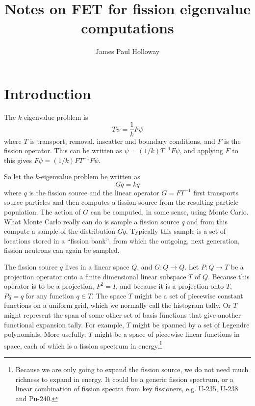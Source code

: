 \documentclass[11pt,onecolumn]{article}
\title{Notes on FET for fission eigenvalue computations}
\author{James Paul Holloway}
\begin{document}
\maketitle

\section{Introduction}

The $k$-eigenvalue problem is 
\begin{equation}
T \psi = \frac{1}{k} F \psi
\end{equation}
where $T$ is transport, removal, inscatter and boundary conditions, and $F$ is the fission operator.  This can be written as $\psi = (1/k) T^{-1} F \psi$, and applying $F$ to this gives $F \psi = (1/k) F T^{-1} F \psi$.

So let the $k$-eigenvalue problem be written as
\begin{equation}
G q = k q
\end{equation}
where $q$ is the fission source and the linear operator $G = F T^{-1}$ first transports source particles and then computes a fission source from the resulting particle population.  The action of $G$ can be computed, in some sense, using Monte Carlo.  What Monte Carlo really can do is sample a fission source $q$ and from this compute a sample of the distribution $G q$.  Typically this sample is a set of locations stored in a ``fission bank'', from which the outgoing, next generation, fission neutrons can again be sampled.

The fission source $q$ lives in a linear space $Q$, and $G: Q \to Q$.
Let $P: Q \to T$ be a projection operator onto a finite dimensional linear subspace $T$ of $Q$.  Because this operator is to be a projection, $P^2 = I$, and because it is a projection onto $T$, $P q = q$ for any function $q \in T$.  The space $T$ might be a set of piecewise constant functions on a uniform grid, which we normally call the histogram tally.  Or $T$ might represent the span of some other set of basis functions that give another functional expansion tally.  For example, $T$ might be spanned by a set of Legendre polynomials.  More usefully, $T$ might be a space of piecewise linear functions in space, each of which is a fission spectrum in energy.\footnote{Because we are only going to expand the fission source, we do not need much richness to expand in energy.  It could be a generic fission spectrum, or a linear combination of fission spectra from key fissioners, e.g. U-235, U-238 and Pu-240.}
\end{document}
